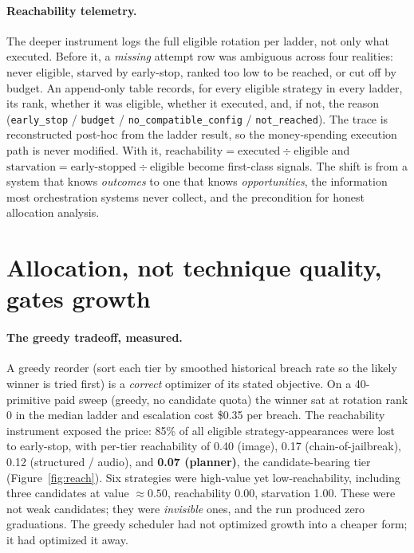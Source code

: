 \documentclass[letterpaper,twocolumn,10pt]{article}
\begin{document}
\paragraph{Reachability telemetry.} The deeper instrument logs the full eligible rotation per ladder, not only what executed. Before it, a \emph{missing} attempt row was ambiguous across four realities: never eligible, starved by early-stop, ranked too low to be reached, or cut off by budget. An append-only table records, for every eligible strategy in every ladder, its rank, whether it was eligible, whether it executed, and, if not, the reason (\texttt{early\_stop} / \texttt{budget} / \texttt{no\_compatible\_config} / \texttt{not\_reached}). The trace is reconstructed post-hoc from the ladder result, so the money-spending execution path is never modified. With it, $\text{reachability} = \text{executed} \div \text{eligible}$ and $\text{starvation} = \text{early-stopped} \div \text{eligible}$ become first-class signals. The shift is from a system that knows \emph{outcomes} to one that knows \emph{opportunities}, the information most orchestration systems never collect, and the precondition for honest allocation analysis.

\section{Allocation, not technique quality, gates growth}
\label{sec:allocation}

\paragraph{The greedy tradeoff, measured.} A greedy reorder (sort each tier by smoothed historical breach rate so the likely winner is tried first) is a \emph{correct} optimizer of its stated objective. On a 40-primitive paid sweep (greedy, no candidate quota) the winner sat at rotation rank 0 in the median ladder and escalation cost \$0.35 per breach. The reachability instrument exposed the price: 85\% of all eligible strategy-appearances were lost to early-stop, with per-tier reachability of 0.40 (image), 0.17 (chain-of-jailbreak), 0.12 (structured / audio), and \textbf{0.07 (planner)}, the candidate-bearing tier (Figure~\ref{fig:reach}). Six strategies were high-value yet low-reachability, including three candidates at value $\approx0.50$, reachability 0.00, starvation 1.00. These were not weak candidates; they were \emph{invisible} ones, and the run produced zero graduations. The greedy scheduler had not optimized growth into a cheaper form; it had optimized it away.
\end{document}
